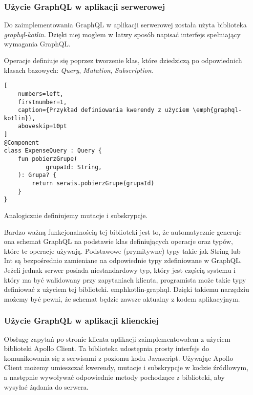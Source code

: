 \subsubsection{Użycie GraphQL w aplikacji serwerowej}
Do zaimplementowania GraphQL w aplikacji serwerowej została użyta biblioteka \emph{graphql-kotlin}. Dzięki niej mogłem w łatwy sposób napisać interfejs spełniający wymagania GraphQL.

Operacje definiuje się poprzez tworzenie klas, które dziedziczą po odpowiednich klasach bazowych: \emph{Query}, \emph{Mutation}, \emph{Subscription}.

\begin{addmargin}[6mm]{0mm}
\begin{lstlisting}[
    numbers=left,
    firstnumber=1,
    caption={Przykład definiowania kwerendy z użyciem \emph{graphql-kotlin}},
    aboveskip=10pt
]
@Component
class ExpenseQuery : Query {
    fun pobierzGrupe(
            grupaId: String,
    ): Grupa? {
        return serwis.pobierzGrupe(grupaId)
    }
}
\end{lstlisting}
\end{addmargin}

Analogicznie definiujemy mutacje i subskrypcje.

Bardzo ważną funkcjonalnością tej biblioteki jest to, że automatycznie generuje ona schemat GraphQL na podstawie klas definiujących operacje oraz typów, które te operacje używają. Podstawowe (prymitywne) typy takie jak String lub Int są bezpośrednio zamieniane na odpowiednie typy zdefiniowane w GraphQL. Jeżeli jednak serwer posiada niestandardowy typ, który jest częścią systemu i który ma być walidowany przy zapytaniach klienta, programista może takie typy definiować z użyciem tej biblioteki. emph{kotlin-graphql}.
Dzięki takiemu narzędziu możemy być pewni, że schemat będzie zawsze aktualny z kodem aplikacyjnym.


\subsubsection{Użycie GraphQL w aplikacji klienckiej}
Obsługę zapytań po stronie klienta aplikacji zaimplementowałem z użyciem biblioteki Apollo Client. Ta biblioteka udostępnia prosty interfejs do komunikowania się z serwisami z poziomu kodu Javascript. Używając Apollo Client możemy umieszczać kwerendy, mutacje i subskrypcje w kodzie źródłowym, a następnie wywoływać odpowiednie metody pochodzące z biblioteki, aby wysyłać żądania do serwera.

